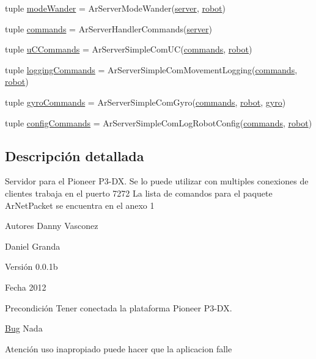 \begin{DoxyCompactItemize}
tuple \hyperlink{namespaceservidor_ae22efed138dafc7284a3f71676a6757f}{modeWander} = ArServerModeWander(\hyperlink{namespaceservidor_adfced13b57fb69c12f8ab5a84d1a2356}{server}, \hyperlink{namespaceservidor_a20c40528942a814c3ba639d6fdf80c34}{robot})
\item 
tuple \hyperlink{namespaceservidor_a4bc8244e73099a1e67418ea064c30097}{commands} = ArServerHandlerCommands(\hyperlink{namespaceservidor_adfced13b57fb69c12f8ab5a84d1a2356}{server})
\item 
tuple \hyperlink{namespaceservidor_aa877c09d4a72ca2434441ff2dc406a29}{uCCommands} = ArServerSimpleComUC(\hyperlink{namespaceservidor_a4bc8244e73099a1e67418ea064c30097}{commands}, \hyperlink{namespaceservidor_a20c40528942a814c3ba639d6fdf80c34}{robot})
\item 
tuple \hyperlink{namespaceservidor_a8f73ad33af2f2a4f3bc9209b9390cfe8}{loggingCommands} = ArServerSimpleComMovementLogging(\hyperlink{namespaceservidor_a4bc8244e73099a1e67418ea064c30097}{commands}, \hyperlink{namespaceservidor_a20c40528942a814c3ba639d6fdf80c34}{robot})
\item 
tuple \hyperlink{namespaceservidor_a9bcfd4f54186b9c69cea8188548af8c8}{gyroCommands} = ArServerSimpleComGyro(\hyperlink{namespaceservidor_a4bc8244e73099a1e67418ea064c30097}{commands}, \hyperlink{namespaceservidor_a20c40528942a814c3ba639d6fdf80c34}{robot}, \hyperlink{namespaceservidor_a73a7e14af1c6774da1d3c5580e02573c}{gyro})
\item 
tuple \hyperlink{namespaceservidor_aa210848229916c300b66b7f7958baa24}{configCommands} = ArServerSimpleComLogRobotConfig(\hyperlink{namespaceservidor_a4bc8244e73099a1e67418ea064c30097}{commands}, \hyperlink{namespaceservidor_a20c40528942a814c3ba639d6fdf80c34}{robot})
\end{DoxyCompactItemize}


\subsection{Descripción detallada}
Servidor para el Pioneer P3-\/DX. Se lo puede utilizar con multiples conexiones de clientes trabaja en el puerto 7272 La lista de comandos para el paquete ArNetPacket se encuentra en el anexo 1 \begin{DoxyAuthor}{Autores}
Danny Vasconez 

Daniel Granda 
\end{DoxyAuthor}
\begin{DoxyVersion}{Versión}
0.0.1b 
\end{DoxyVersion}
\begin{DoxyDate}{Fecha}
2012 
\end{DoxyDate}
\begin{DoxyPrecond}{Precondición}
Tener conectada la plataforma Pioneer P3-\/DX. 
\end{DoxyPrecond}
\begin{Desc}
\item[\hyperlink{bug__bug000003}{Bug}]Nada \end{Desc}
\begin{DoxyWarning}{Atención}
uso inapropiado puede hacer que la aplicacion falle 
\end{DoxyWarning}


